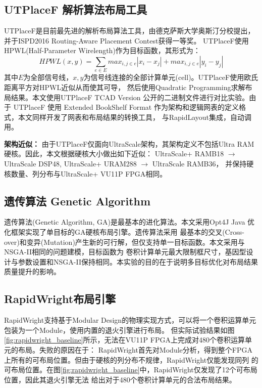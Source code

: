 \subsection{UTPlaceF 解析算法布局工具}

UTPlaceF是目前最先进的解析布局算法工具，由德克萨斯大学奥斯汀分校提出，并于ISPD2016 Routing-Aware Placement Contest获得一等奖。
UTPlaceF使用HPWL(Half-Parameter Wirelength)作为目标函数，其形式为：
$$ HPWL(x,y) = \sum_{e \in E} {max_{i,j \in e} |x_i-x_j| + max_{i,j \in e} |y_i-y_j|} $$
其中$E$为全部信号线，$x, y$为信号线连接的全部计算单元(cell)。UTPlaceF使用欧氏距离平方对HPWL近似从而使其可导，
然后使用Quadratic Programming求解布局结果。本文使用UTPlaceF TCAD Version 公开的二进制文件进行对比实验。由于
UTPlaceF 使用 Extended BookShelf Format 作为架构和逻辑网表的定义格式，本文同样开发了网表和布局结果的转换工具，
与RapidLayout集成，自动调用。

{\bf 架构近似：} 由于UTPlaceF仅面向UltraScale架构，其架构定义不包括Ultra RAM硬核。因此，本文根据硬核大小做出如下近似：
UltraScale+ RAMB18 $\rightarrow$ UltraScale DSP48, 
UltraScale+ URAM288 $\rightarrow$ UltraScale RAMB36，
并保持硬核数量、列分布与UltraScale+ VU11P FPGA相同。

\subsection{遗传算法 Genetic Algorithm}

遗传算法(Genetic Algorithm, GA)是最基本的进化算法。本文采用Opt4J Java 优化框架实现了单目标的GA硬核布局引擎。遗传算法采用
最基本的交叉(Cross-over)和变异(Mutation)产生新的可行解，但仅支持单一目标函数。本文采用与NSGA-II相同的问题建模，目标函数为
卷积计算单元最大限制框尺寸，基因型设计与参数设置和NSGA-II保持相同。本实验的目的在于说明多目标优化对布局结果质量提升的影响。

\subsection{RapidWright布局引擎}

RapidWright支持基于Modular Design的物理实现方式，可以将一个卷积运算单元包装为一个Module，使用内置的退火引擎进行布局。
但实际试验结果如图\ref{fig:rapidwright_baseline}所示，无法在VU11P FPGA上完成对480个卷积运算单元的布局。失败的原因在于：
RapidWright首先对Module分析，得到整个FPGA上所有的可布局位置。但由于硬核的列分布不规律，RapidWright仅能发现同列
的可布局位置。在图\ref{fig:rapidwright_baseline}中，RapidWright仅发现了12个可布局位置，因此其退火引擎无法
给出对于480个卷积计算单元的合法布局结果。

